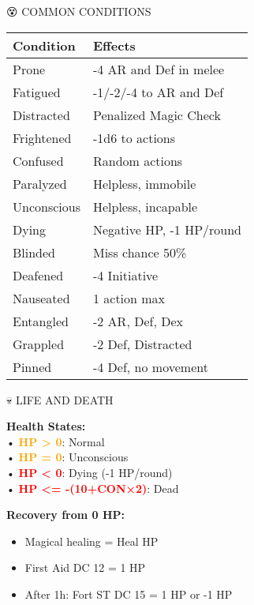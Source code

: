 \documentclass[10pt,a4paper,landscape]{article}
\newcommand{\highlight}[1]{\textcolor{orange}{\textbf{#1}}}
\newcommand{\critical}[1]{\textcolor{red}{\textbf{#1}}}
\begin{document}
\begin{multicols}{4}
		\begin{mainsection}{😵 COMMON CONDITIONS}
			\begin{tabular}{@{}p{2.2cm}p{3.4cm}@{}}
				\toprule
				\textbf{Condition} & \textbf{Effects} \\
				\midrule
				Prone & -4 AR and Def in melee \\
				Fatigued & -1/-2/-4 to AR and Def \\
				Distracted & Penalized Magic Check \\
				Frightened & -1d6 to actions \\
				Confused & Random actions \\
				Paralyzed & Helpless, immobile \\
				Unconscious & Helpless, incapable \\
				Dying & Negative HP, -1 HP/round \\
				Blinded & Miss chance 50\% \\
				Deafened & -4 Initiative \\
				Nauseated & 1 action max \\
				Entangled & -2 AR, Def, Dex \\
				Grappled & -2 Def, Distracted \\
				Pinned & -4 Def, no movement \\
				\bottomrule
			\end{tabular}
		\end{mainsection}

		\begin{mainsection}{💀 LIFE AND DEATH}
			\begin{formula}
				\textbf{Health States:}\\
				• \highlight{HP > 0}: Normal\\
				• \highlight{HP = 0}: Unconscious\\
				• \critical{HP < 0}: Dying (-1 HP/round)\\
				• \critical{HP <= -(10+CON×2)}: Dead
			\end{formula}

			\textbf{Recovery from 0 HP:}
			\begin{itemize}[noitemsep,leftmargin=8pt]
				\item Magical healing = Heal HP
				\item First Aid DC 12 = 1 HP
				\item After 1h: Fort ST DC 15 = 1 HP or -1 HP
			\end{itemize}


\end{mainsection}
\end{multicols}
\end{document}
